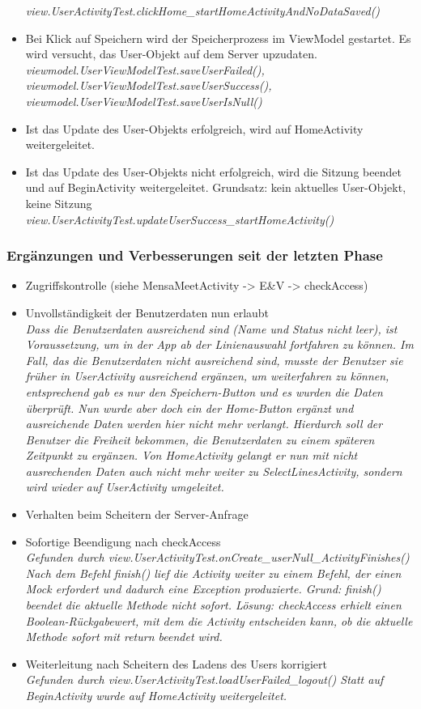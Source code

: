 \documentclass[a4paper]{scrreprt}
\begin{document}
\begin{itemize}
\textit{view.UserActivityTest.clickHome\_startHomeActivityAndNoDataSaved()}
\item Bei Klick auf Speichern wird der Speicherprozess im ViewModel gestartet. Es wird versucht, das User-Objekt auf dem Server upzudaten. \\
\textit{viewmodel.UserViewModelTest.saveUserFailed(), viewmodel.UserViewModelTest.saveUserSuccess(), viewmodel.UserViewModelTest.saveUserIsNull()}
\item Ist das Update des User-Objekts erfolgreich, wird auf HomeActivity weitergeleitet.
\item Ist das Update des User-Objekts nicht erfolgreich, wird die Sitzung beendet und auf BeginActivity weitergeleitet. Grundsatz: kein aktuelles User-Objekt, keine Sitzung\\
\textit{view.UserActivityTest.updateUserSuccess\_startHomeActivity()}
\end{itemize}

\subsubsection{Ergänzungen und Verbesserungen seit der letzten Phase}

\begin{itemize}
\item Zugriffskontrolle (siehe MensaMeetActivity -> E\&V -> checkAccess)
\item Unvollständigkeit der Benutzerdaten nun erlaubt \\
\textit{Dass die Benutzerdaten ausreichend sind (Name und Status nicht leer), ist Voraussetzung, um in der App ab der Linienauswahl fortfahren zu können. Im Fall, das die Benutzerdaten nicht ausreichend sind, musste der Benutzer sie früher in UserActivity ausreichend ergänzen, um weiterfahren zu können, entsprechend gab es nur den Speichern-Button und es wurden die Daten überprüft. Nun wurde aber doch ein der Home-Button ergänzt und ausreichende Daten werden hier nicht mehr verlangt. Hierdurch soll der Benutzer die Freiheit bekommen, die Benutzerdaten zu einem späteren Zeitpunkt zu ergänzen. Von HomeActivity gelangt er nun mit nicht ausrechenden Daten auch nicht mehr weiter zu SelectLinesActivity, sondern wird wieder auf UserActivity umgeleitet. }
\item Verhalten beim Scheitern der Server-Anfrage
\item Sofortige Beendigung nach checkAccess\\
\textit{Gefunden durch view.UserActivityTest.onCreate\_userNull\_ActivityFinishes()
Nach dem Befehl finish() lief die Activity weiter zu einem Befehl, der einen Mock erfordert und dadurch eine Exception produzierte. Grund: finish() beendet die aktuelle Methode nicht sofort. Lösung: checkAccess erhielt einen Boolean-Rückgabewert, mit dem die Activity entscheiden kann, ob die aktuelle Methode sofort mit return beendet wird. }
\item Weiterleitung nach Scheitern des Ladens des Users korrigiert\\
\textit{Gefunden durch view.UserActivityTest.loadUserFailed\_logout()
Statt auf BeginActivity wurde auf HomeActivity weitergeleitet.}
\end{itemize}
\end{document}

